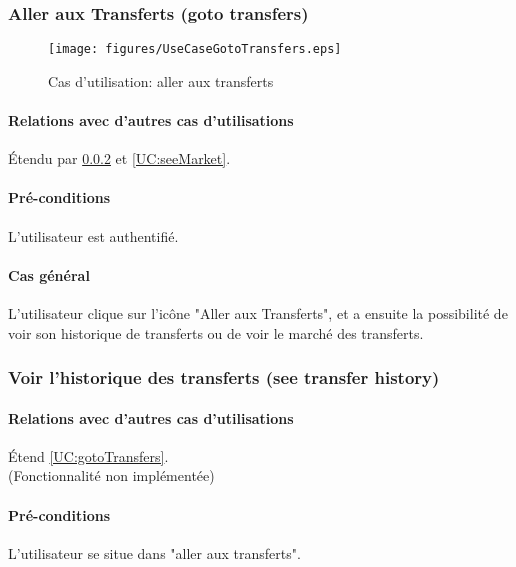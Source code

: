 
\subsubsection{Aller aux Transferts (goto transfers)} 
\begin{figure}[h]
  \centering
  \texttt{[image: figures/UseCaseGotoTransfers.eps]}
   \caption{\label{fig:UC:gotoTransfers} Cas d'utilisation: aller aux transferts}
\end{figure}

\label{UC:gotoTransfers}
\paragraph{Relations avec d'autres cas d'utilisations}
Étendu par \ref{UC:transfersHistory} et \ref{UC:seeMarket}.
\paragraph{Pré-conditions}
\begin{list}{}{\leftmargin=1.5em}
\item{L'utilisateur est authentifié.}
\end{list}
\paragraph{Cas général}
L'utilisateur clique sur l'icône "Aller aux Transferts", et a ensuite la possibilité de voir son historique de transferts ou de voir le marché des transferts.

\subsubsection{Voir l'historique des transferts (see transfer history)}
\label{UC:transfersHistory}
\paragraph{Relations avec d'autres cas d'utilisations}
Étend \ref{UC:gotoTransfers}.
\\(Fonctionnalité non implémentée)
\paragraph{Pré-conditions}
\begin{list}{}{\leftmargin=1.5em}
\item{L'utilisateur se situe dans "aller aux transferts".}
\end{list}
